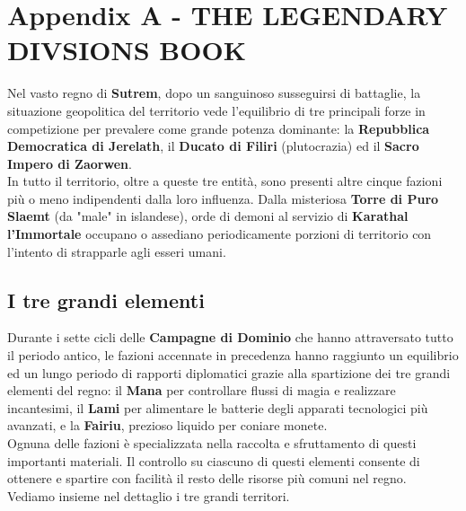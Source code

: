\documentclass[a4paper]{scrreprt}
\begin{document}
\chapter{Appendix A - THE LEGENDARY DIVSIONS BOOK}
Nel vasto regno di \textbf{Sutrem}, dopo un sanguinoso susseguirsi di battaglie, la situazione geopolitica del territorio vede l'equilibrio di tre principali forze in competizione per prevalere come grande potenza dominante: la \textbf{Repubblica Democratica di Jerelath}, il \textbf{Ducato di Filiri} (plutocrazia) ed il \textbf{Sacro Impero di Zaorwen}.\\
In tutto il territorio, oltre a queste tre entità, sono presenti altre cinque fazioni più o meno indipendenti dalla loro influenza. Dalla misteriosa \textbf{Torre di Puro Slaemt} (da "male" in islandese), orde di demoni al servizio di \textbf{Karathal l'Immortale} occupano o assediano periodicamente porzioni di territorio con l'intento di strapparle agli esseri umani.\\

\section{I tre grandi elementi}
Durante i sette cicli delle \textbf{Campagne di Dominio} che hanno attraversato tutto il periodo antico, le fazioni accennate in precedenza hanno raggiunto un equilibrio ed un lungo periodo di rapporti diplomatici grazie alla spartizione dei tre grandi elementi del regno: il \textbf{Mana} per controllare flussi di magia e realizzare incantesimi, il \textbf{Lami} per alimentare le batterie degli apparati tecnologici più avanzati, e la \textbf{Fairiu}, prezioso liquido per coniare monete.\\
Ognuna delle fazioni è specializzata nella raccolta e sfruttamento di questi importanti materiali. Il controllo su ciascuno di questi elementi consente di ottenere e spartire con facilità il resto delle risorse più comuni nel regno.\\
Vediamo insieme nel dettaglio i tre grandi territori. 
\end{document}
